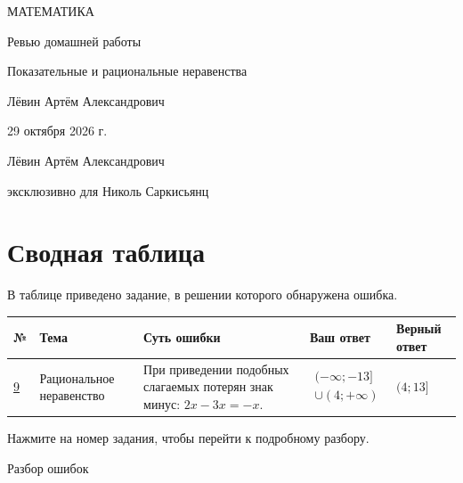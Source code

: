 \documentclass[a4paper,12pt]{article}
\begin{document}
\thispagestyle{empty}
\begin{center}
\vspace*{39mm}
{\color{accent}\large МАТЕМАТИКА}\par
\vspace{22mm}
{\Huge Ревью домашней работы}\par
\vspace{12mm}
{\color{accent}\Large Показательные и рациональные неравенства}\par
\vspace{33mm}
{\large Лёвин Артём Александрович}\par
\vspace{13mm}
{\large 29 октября 2026 г.}\par
\vfill
{\small\color{muted}Лёвин Артём Александрович}\par
{\small\color{muted}эксклюзивно для Николь Саркисьянц}\par
\vspace{19mm}
\end{center}
\clearpage
\section*{Сводная таблица}
\vspace{4mm}
В таблице приведено задание, в решении которого обнаружена ошибка.

\vspace{4mm}\par\noindent
\small
\renewcommand{\arraystretch}{1.5}
\begin{tabularx}{0.98\linewidth}{@{}p{8mm}p{27mm}X p{35mm}p{22mm}@{}}
\toprule
\textbf{№} & \textbf{Тема} & \textbf{Суть ошибки} & \textbf{Ваш ответ} & \textbf{Верный ответ}\\
\midrule
\hyperref[task:9]{9} & Рациональное неравенство & При приведении подобных слагаемых потерян знак минус: $2x-3x=-x$. & $\begin{gathered}(-\infty;-13]\\ \cup(4;+\infty)\end{gathered}$ & $(4;13]$\\
\bottomrule
\end{tabularx}
\normalsize
\vfill
{\color{muted}\small Нажмите на номер задания, чтобы перейти к подробному разбору.}
\clearpage
\thispagestyle{empty}
\vspace*{0.38\textheight}
\begin{center}
{\color{accent}\huge Разбор ошибок}
\end{center}
\clearpage
{}\label{task:9}
\end{document}
